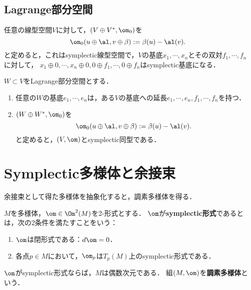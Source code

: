\documentclass[uplatex,dvipdfmx]{jsreport}
\begin{document}
\subsection{Lagrange部分空間}

\begin{lemma}
    任意の線型空間$V$に対して，$(V\oplus V^*,\om_0)$を
    \[\om_0(u\oplus\al,v\oplus\beta):=\beta(u)-\al(v).\]
    と定めると，これはsymplectic線型空間で，$V$の基底$x_1,\cdots,x_n$とその双対$f_1,\cdots,f_n$に対して，
    $x_1\oplus0,\cdots,x_n\oplus0,0\oplus f_1,\cdots,0\oplus f_n$はsymplectic基底になる．
\end{lemma}

\begin{proposition}
    $W\subset V$をLagrange部分空間とする．
    \begin{enumerate}
        \item 任意の$W$の基底$e_1,\cdots,e_n$は，ある$V$の基底への延長$e_1,\cdots,e_n,f_1,\cdots,f_n$を持つ．
        \item $(W\oplus W^*,\om_0)$を
        \[\om_0(u\oplus\al,v\oplus\beta):=\beta(u)-\al(v).\]
        と定めると，$(V,\om)$とsymplectic同型である．
    \end{enumerate}
\end{proposition}

\section{Symplectic多様体と余接束}

\begin{tcolorbox}[colframe=ForestGreen, colback=ForestGreen!10!white,breakable,colbacktitle=ForestGreen!40!white,coltitle=black,fonttitle=\bfseries\sffamily,
    title=]
    余接束として得た多様体を抽象化すると，調素多様体を得る．
\end{tcolorbox}

\begin{definition}
    $M$を多様体，$\om\in\Om^2(M)$を2-形式とする．
    $\om$が\textbf{symplectic形式}であるとは，次の2条件を満たすことをいう：
    \begin{enumerate}
        \item $\om$は閉形式である：$d\om=0$．
        \item 各点$p\in M$において，$\om_p$は$T_p(M)$上のsymplectic形式である．
    \end{enumerate}
    $\om$がsymplectic形式ならば，$M$は偶数次元である．
    組$(M,\om)$を\textbf{調素多様体}という．
\end{definition}
\end{document}
